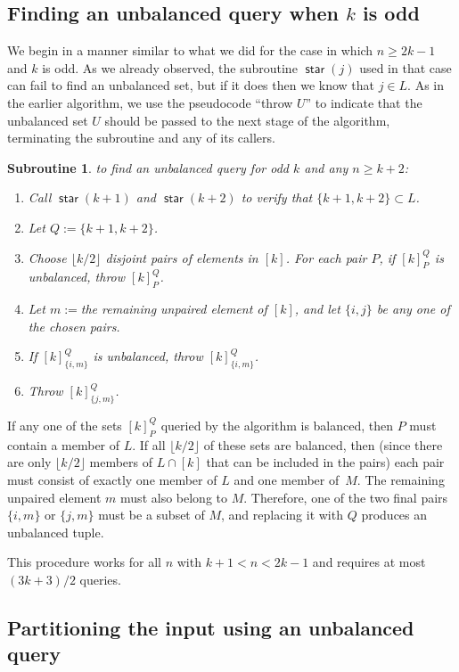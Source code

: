 \documentclass[11pt]{llncs}
\newcommand{\starsub}{\operatorname{\mathsf{star}}}
\newcommand{\assign}{:=}
\newtheorem{subroutine}{Subroutine}
\begin{document}
\subsection{Finding an unbalanced query when $k$ is odd}

We begin in a manner similar to what we did for the case in which $n\geq 2k-1$ and $k$ is odd.
As we already observed, the subroutine $\starsub(j)$ used in that case can fail to find an unbalanced set, but if it does then we know that $j\in L$. As in the earlier algorithm, we use the pseudocode ``throw $U$'' to indicate that the unbalanced set $U$ should be passed to the next stage of the algorithm, terminating the subroutine and any of its callers.

\begin{subroutine} to find an unbalanced query for odd $k$ and any $n\geq k+2$:
\begin{enumerate}
\item Call $\starsub(k+1)$ and $\starsub(k+2)$ to verify that $\{k+1,k+2\}\subset L$.
\item Let $Q\assign \{k+1,k+2\}$.
\item Choose $\lfloor k/2\rfloor$ disjoint pairs of elements in $[k]$. For each pair $P$,
      if $[k]_P^Q$ is unbalanced, throw $[k]_P^Q$.
\item Let $m\assign{}$the remaining unpaired element of $[k]$, and let $\{i,j\}$ be any one of the chosen pairs.
\item If $[k]_{\{i,m\}}^Q$ is unbalanced, throw $[k]_{\{i,m\}}^Q$.
\item Throw $[k]_{\{j,m\}}^Q$.
\end{enumerate}
\end{subroutine}

If any one of the sets $[k]_P^Q$ queried by the algorithm is balanced, then $P$ must contain a member of $L$. If all $\lfloor k/2\rfloor$ of these sets are balanced, then (since there are only $\lfloor k/2\rfloor$ members of $L\cap [k]$ that can be included in the pairs) each pair must consist of exactly one member of $L$ and one member of~$M$. The remaining unpaired element $m$ must also belong to $M$. Therefore, one of the two final pairs $\{i,m\}$ or $\{j,m\}$ must be a subset of $M$, and replacing it with $Q$ produces an unbalanced tuple.

This procedure works for all $n$ with $k+1<n<2k-1$ and requires at most $(3k+3)/2$ queries.

\subsection{Partitioning the input using an unbalanced query}
\end{document}
